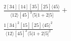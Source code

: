 \documentclass[varwidth, border=5pt]{standalone}
\begin{document}
\begin{my}
$\begin{gathered}
\scriptscriptstyle\frac{2[34][14][35][25]⟨45⟩}{⟨12⟩[45]^3⟨5|1+2|5]}+\\
\scriptscriptstyle\frac{1[34]^2[15][25]⟨45⟩^2}{⟨12⟩[45]^2⟨5|1+2|5]^2}\phantom{+}
\end{gathered}$
\end{my}
\end{document}
